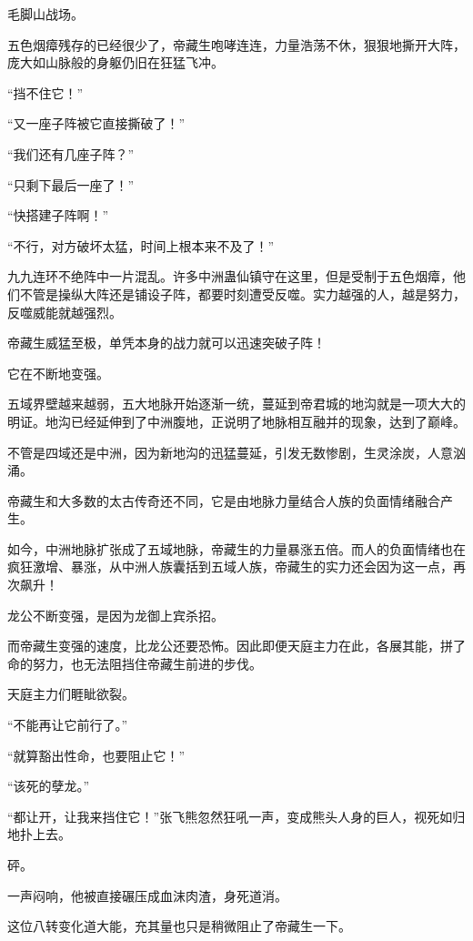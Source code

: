 
\begin{this_body}

毛脚山战场。

五色烟瘴残存的已经很少了，帝藏生咆哮连连，力量浩荡不休，狠狠地撕开大阵，庞大如山脉般的身躯仍旧在狂猛飞冲。

“挡不住它！”

“又一座子阵被它直接撕破了！”

“我们还有几座子阵？”

“只剩下最后一座了！”

“快搭建子阵啊！”

“不行，对方破坏太猛，时间上根本来不及了！”

九九连环不绝阵中一片混乱。许多中洲蛊仙镇守在这里，但是受制于五色烟瘴，他们不管是操纵大阵还是铺设子阵，都要时刻遭受反噬。实力越强的人，越是努力，反噬威能就越强烈。

帝藏生威猛至极，单凭本身的战力就可以迅速突破子阵！

它在不断地变强。

五域界壁越来越弱，五大地脉开始逐渐一统，蔓延到帝君城的地沟就是一项大大的明证。地沟已经延伸到了中洲腹地，正说明了地脉相互融并的现象，达到了巅峰。

不管是四域还是中洲，因为新地沟的迅猛蔓延，引发无数惨剧，生灵涂炭，人意汹涌。

帝藏生和大多数的太古传奇还不同，它是由地脉力量结合人族的负面情绪融合产生。

如今，中洲地脉扩张成了五域地脉，帝藏生的力量暴涨五倍。而人的负面情绪也在疯狂激增、暴涨，从中洲人族囊括到五域人族，帝藏生的实力还会因为这一点，再次飙升！

龙公不断变强，是因为龙御上宾杀招。

而帝藏生变强的速度，比龙公还要恐怖。因此即便天庭主力在此，各展其能，拼了命的努力，也无法阻挡住帝藏生前进的步伐。

天庭主力们睚眦欲裂。

“不能再让它前行了。”

“就算豁出性命，也要阻止它！”

“该死的孽龙。”

“都让开，让我来挡住它！”张飞熊忽然狂吼一声，变成熊头人身的巨人，视死如归地扑上去。

砰。

一声闷响，他被直接碾压成血沫肉渣，身死道消。

这位八转变化道大能，充其量也只是稍微阻止了帝藏生一下。


\end{this_body}

